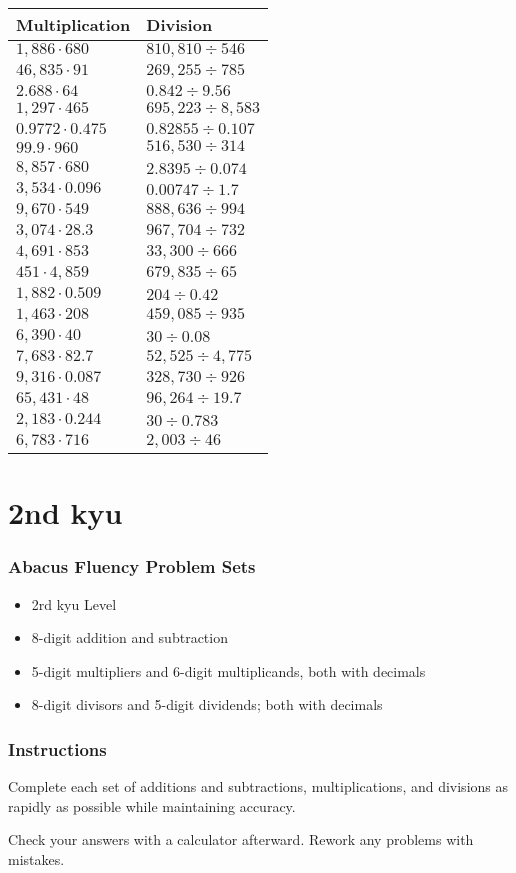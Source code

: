 \begin{longtable}[]{@{}ll@{}}
\toprule
Multiplication & Division\tabularnewline
\midrule
\endhead
\(1,886\cdot680\) & \(810,810÷546\)\tabularnewline
\(46,835\cdot91\) & \(269,255÷785\)\tabularnewline
\(2.688\cdot64\) & \(0.842÷9.56\)\tabularnewline
\(1,297\cdot465\) & \(695,223÷8,583\)\tabularnewline
\(0.9772\cdot0.475\) & \(0.82855÷0.107\)\tabularnewline
\(99.9\cdot960\) & \(516,530÷314\)\tabularnewline
\(8,857\cdot680\) & \(2.8395÷0.074\)\tabularnewline
\(3,534\cdot0.096\) & \(0.00747÷1.7\)\tabularnewline
\(9,670\cdot549\) & \(888,636÷994\)\tabularnewline
\(3,074\cdot28.3\) & \(967,704÷732\)\tabularnewline
\(4,691\cdot853\) & \(33,300÷666\)\tabularnewline
\(451\cdot4,859\) & \(679,835÷65\)\tabularnewline
\(1,882\cdot0.509\) & \(204÷0.42\)\tabularnewline
\(1,463\cdot208\) & \(459,085÷935\)\tabularnewline
\(6,390\cdot40\) & \(30÷0.08\)\tabularnewline
\(7,683\cdot82.7\) & \(52,525÷4,775\)\tabularnewline
\(9,316\cdot0.087\) & \(328,730÷926\)\tabularnewline
\(65,431\cdot48\) & \(96,264÷19.7\)\tabularnewline
\(2,183\cdot0.244\) & \(30÷0.783\)\tabularnewline
\(6,783\cdot716\) & \(2,003÷46\)\tabularnewline
\bottomrule
\end{longtable}

\hypertarget{nd-kyu}{%
\section{2nd kyu}\label{nd-kyu}}

\hypertarget{abacus-fluency-problem-sets}{%
\subsubsection{Abacus Fluency Problem
Sets}\label{abacus-fluency-problem-sets}}

\begin{itemize}
\item
  2rd kyu Level
\item
  8-digit addition and subtraction
\item
  5-digit multipliers and 6-digit multiplicands, both with decimals
\item
  8-digit divisors and 5-digit dividends; both with decimals
\end{itemize}

\hypertarget{instructions}{%
\subsubsection{Instructions}\label{instructions}}

Complete each set of additions and subtractions, multiplications, and
divisions as rapidly as possible while maintaining accuracy.

Check your answers with a calculator afterward. Rework any problems with
mistakes.
